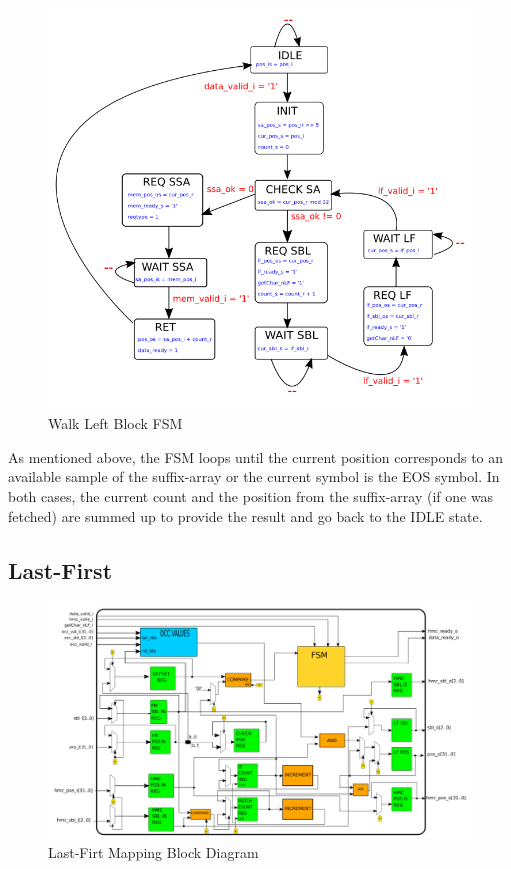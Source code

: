 \begin{minipage}[t]{0.45\textwidth}
\begin{figure}[H]
    \centering
    \hspace*{-25mm}\includegraphics[scale = 0.45]{Figures/WL_FSM.png}
    \caption{Walk Left Block FSM}
    \label{fig:wl_fsm}
\end{figure}
\end{minipage}
\hfill
\begin{minipage}[t]{0.3\textwidth}
As mentioned above, the FSM loops until the current position corresponds to an available sample of the suffix-array or the current symbol is the EOS symbol. In both cases, the current count and the position from the suffix-array (if one was fetched) are summed up to provide the result and go back to the IDLE state.

\end{minipage}
\vspace*{8mm}


\subsection{Last-First}
\begin{figure}[H]
    \centering
   \includegraphics[scale = 0.4]{Figures/LF_DIAG.png}
    \caption{Last-Firt Mapping Block Diagram}
    \label{fig:bounds_diag}
\end{figure}

